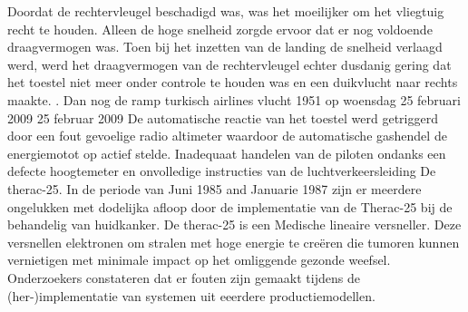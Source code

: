 Doordat de rechtervleugel beschadigd was, was het moeilijker om het vliegtuig recht te houden. Alleen de hoge snelheid zorgde ervoor dat er nog voldoende draagvermogen was. Toen bij het inzetten van de landing de snelheid verlaagd werd, werd het draagvermogen van de rechtervleugel echter dusdanig gering dat het toestel niet meer onder controle te houden was en een duikvlucht naar rechts maakte.
\cite{aviationsafety04101992airplaneCrashBijlmer}
 \cite{catsr25022009Boeing737AmsterdamCrash}
\cite{zuilen23022019Tijdlijnpoldercrash}
\cite{wikinews04032009techfoutailines1951}
\cite{luchtvaartnieuws21012020boeing737conclusies}
\cite{adformatie280220209communicatiegebreken}
\cite{spinnael25022009onderzoekpolderbaancrash}
\cite{crashTurkishAirlines}
\cite{flightradar24}
\cite{flightstatstracker}. 
\newline \indent Dan nog de  ramp turkisch airlines vlucht 1951 op woensdag 25 februari 2009
25 februar 2009
De automatische reactie van het toestel werd getriggerd door een fout gevoelige radio altimeter waardoor de automatische gashendel de energiemotot op actief stelde.
Inadequaat handelen van de piloten ondanks een defecte hoogtemeter en onvolledige instructies van de luchtverkeersleiding
\cite{catsr25022009Boeing737AmsterdamCrash}
\cite{zuilen23022019Tijdlijnpoldercrash}
\cite{wikinews04032009techfoutailines1951}
\cite{luchtvaartnieuws21012020boeing737conclusies}
\cite{adformatie280220209communicatiegebreken}
\cite{spinnael25022009onderzoekpolderbaancrash}
\cite{crashTurkishAirlines}
\cite{flightradar24}
\cite{flightstatstracker}
\newline \indent De therac-25. In de periode van Juni 1985 and Januarie 1987 zijn er meerdere ongelukken met dodelijka afloop door de implementatie van de Therac-25 bij de behandelig van huidkanker.
De therac-25 is een Medische lineaire versneller. Deze  versnellen elektronen om stralen met hoge energie te creëren die tumoren kunnen vernietigen met minimale impact op het omliggende gezonde weefsel.
Onderzoekers constateren dat er fouten zijn gemaakt tijdens de (her-)implementatie van systemen uit eeerdere productiemodellen.


